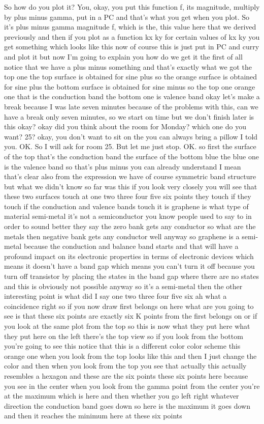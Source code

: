 So how do you plot it? You, okay, you put this function f, its magnitude, multiply by plus minus gamma, put in a PC and that's what you get when you plot. So it's plus minus gamma magnitude f, which is the, this value here that we derived previously and then if you plot as a function kx ky for certain values of kx ky you get something which looks like this now of course this is just put in PC and curry and plot it but now I'm going to explain you how do we get it the first of all notice that we have a plus minus something and that's exactly what we got the top one the top surface is obtained for sine plus so the orange surface is obtained for sine plus the bottom surface is obtained for sine minus so the top one orange one that is the conduction band the bottom one is valence band okay let's make a break because I was late seven minutes because of the problems with this, can we have a break only seven minutes, so we start on time but we don't finish later is this okay? okay did you think about the room for Monday? which one do you want? 25? okay, you don't want to sit on the you can always bring a pillow I told you. OK. So I will ask for room 25. But let me just stop. OK. so first the surface of the top that's the conduction band the surface of the bottom blue the blue one is the valence band so that's plus minus you can already understand I mean that's clear also from the expression we have of course symmetric band structure but what we didn't know so far was this if you look very closely you will see that these two surfaces touch at one two three four five six points they touch if they touch if the conduction and valence bands touch it is graphene is what type of material semi-metal it's not a semiconductor you know people used to say to in order to sound better they say the zero bank gets any conductor so what are the metals then negative bank gets any conductor well anyway so graphene is a semi-metal because the conduction and balance band starts and that will have a profound impact on its electronic properties in terms of electronic devices which means it doesn't have a band gap which means you can't turn it off because you turn off transistor by placing the states in the band gap where there are no states and this is obviously not possible anyway so it's a semi-metal then the other interesting point is what did I say one two three four five six ah what a coincidence right so if you now draw first belongs on here what are you going to see is that these six points are exactly six K points from the first belongs on or if you look at the same plot from the top so this is now what they put here what they put here on the left there's the top view so if you look from the bottom you're going to see this notice that this is a different color color scheme this orange one when you look from the top looks like this and then I just change the color and then when you look from the top you see that actually this actually resembles a hexagon and these are the six points these six points here because you see in the center when you look from the gamma point from the center you're at the maximum which is here and then whether you go left right whatever direction the conduction band goes down so here is the maximum it goes down and then it reaches the minimum here at these six points 